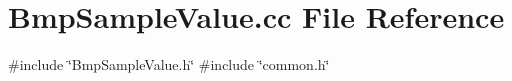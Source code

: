 \section{Bmp\+Sample\+Value.\+cc File Reference}
\label{BmpSampleValue_8cc}
{\ttfamily \#include \char`\"{}Bmp\+Sample\+Value.\+h\char`\"{}}\newline
{\ttfamily \#include \char`\"{}common.\+h\char`\"{}}\newline
